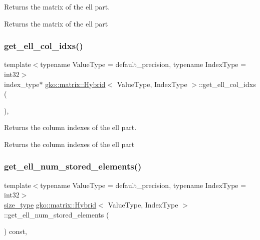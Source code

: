 Returns the matrix of the ell part. 

\begin{DoxyReturn}{Returns}
the matrix of the ell part 
\end{DoxyReturn}
\mbox{\label{classgko_1_1matrix_1_1Hybrid_ac46548ef106a6b8fe32219d3e11aab22}} 
\subsubsection{\texorpdfstring{get\+\_\+ell\+\_\+col\+\_\+idxs()}{get\_ell\_col\_idxs()}}
{\footnotesize\ttfamily template$<$typename Value\+Type = default\+\_\+precision, typename Index\+Type = int32$>$ \\
index\+\_\+type$\ast$ \hyperlink{classgko_1_1matrix_1_1Hybrid}{gko\+::matrix\+::\+Hybrid}$<$ Value\+Type, Index\+Type $>$\+::get\+\_\+ell\+\_\+col\+\_\+idxs (\begin{DoxyParamCaption}{ }\end{DoxyParamCaption})\hspace{0.3cm}{\ttfamily [inline]}, {\ttfamily [noexcept]}}



Returns the column indexes of the ell part. 

\begin{DoxyReturn}{Returns}
the column indexes of the ell part 
\end{DoxyReturn}
\mbox{\label{classgko_1_1matrix_1_1Hybrid_a99ab36f3aeae944db440a8bbe324aaff}} 
\subsubsection{\texorpdfstring{get\+\_\+ell\+\_\+num\+\_\+stored\+\_\+elements()}{get\_ell\_num\_stored\_elements()}}
{\footnotesize\ttfamily template$<$typename Value\+Type = default\+\_\+precision, typename Index\+Type = int32$>$ \\
\hyperlink{namespacegko_a6e5c95df0ae4e47aab2f604a22d98ee7}{size\+\_\+type} \hyperlink{classgko_1_1matrix_1_1Hybrid}{gko\+::matrix\+::\+Hybrid}$<$ Value\+Type, Index\+Type $>$\+::get\+\_\+ell\+\_\+num\+\_\+stored\+\_\+elements (\begin{DoxyParamCaption}{ }\end{DoxyParamCaption}) const\hspace{0.3cm}{\ttfamily [inline]}, {\ttfamily [noexcept]}}



